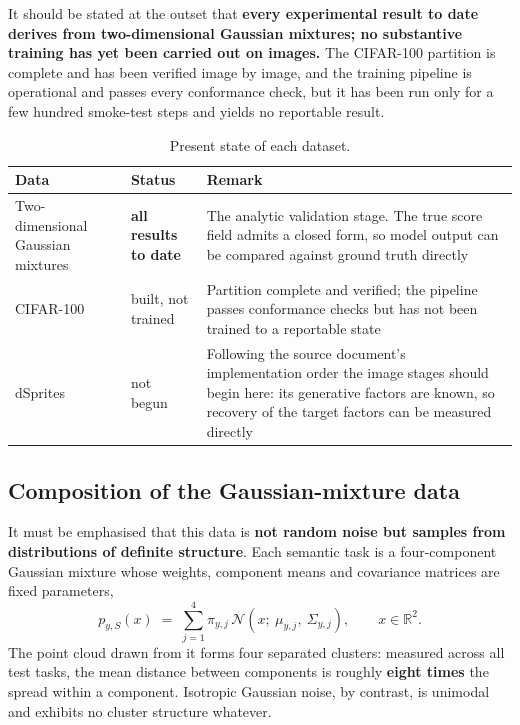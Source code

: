 \documentclass[11pt]{article}
\begin{document}
It should be stated at the outset that \textbf{every experimental result to date derives from
two-dimensional Gaussian mixtures; no substantive training has yet been carried out on images.} The
CIFAR-100 partition is complete and has been verified image by image, and the training pipeline is
operational and passes every conformance check, but it has been run only for a few hundred
smoke-test steps and yields no reportable result.

\begin{table}[htbp]
\centering\small
\begin{tabular}{@{}p{4.0cm}p{3.0cm}p{6.6cm}@{}}
\toprule
\textbf{Data} & \textbf{Status} & \textbf{Remark} \\
\midrule
Two-dimensional Gaussian mixtures & \textcolor{amber}{\textbf{all results to date}}
  & The analytic validation stage. The true score field admits a closed form, so model output can be
    compared against ground truth directly \\[2pt]
CIFAR-100 & built, not trained
  & Partition complete and verified; the pipeline passes conformance checks but has not been trained
    to a reportable state \\[2pt]
dSprites & not begun
  & Following the source document's implementation order the image stages should begin here: its
    generative factors are known, so recovery of the target factors can be measured directly \\
\bottomrule
\end{tabular}
\caption{Present state of each dataset.}
\label{tab:datastatus}
\end{table}

\subsection{Composition of the Gaussian-mixture data}

It must be emphasised that this data is \textbf{not random noise but samples from distributions of
definite structure}. Each semantic task is a four-component Gaussian mixture whose weights,
component means and covariance matrices are fixed parameters,
\begin{equation}
p_{y,S}(x)\;=\;\sum_{j=1}^{4}\pi_{y,j}\,\mathcal{N}\!\left(x;\ \mu_{y,j},\ \Sigma_{y,j}\right),
\qquad x\in\mathbb{R}^{2}.
\end{equation}
The point cloud drawn from it forms four separated clusters: measured across all test tasks, the
mean distance between components is roughly \textbf{eight times} the spread within a component.
Isotropic Gaussian noise, by contrast, is unimodal and exhibits no cluster structure whatever.
\end{document}

